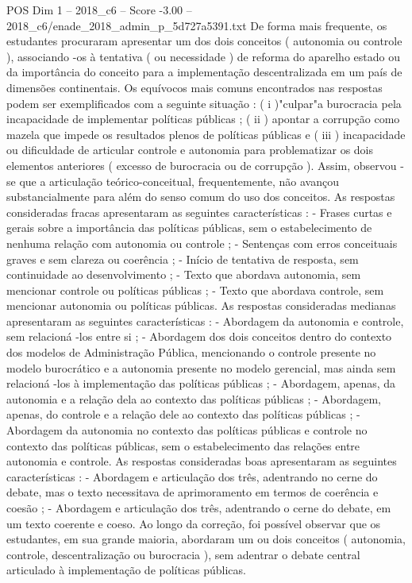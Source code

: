 \begin{textsample}{POS Dim 1 – 2018\_c6 – Score -3.00 – 2018\_c6/enade\_2018\_admin\_p\_5d727a5391.txt}
De forma mais frequente, os estudantes procuraram apresentar um dos dois conceitos ( autonomia ou controle ), associando -os à tentativa ( ou necessidade ) de reforma do aparelho estado ou da importância do conceito para a implementação descentralizada em um país de dimensões continentais.
Os equívocos mais comuns encontrados nas respostas podem ser exemplificados com a seguinte situação : ( i )"culpar"a burocracia pela incapacidade de implementar políticas públicas ; ( ii ) apontar a corrupção como mazela que impede os resultados plenos de políticas públicas e ( iii ) incapacidade ou dificuldade de articular controle e autonomia para problematizar os dois elementos anteriores ( excesso de burocracia ou de corrupção ).
Assim, observou -se que a articulação teórico-conceitual, frequentemente, não avançou substancialmente para além do senso comum do uso dos conceitos.
As respostas consideradas fracas apresentaram as seguintes características : - Frases curtas e gerais sobre a importância das políticas públicas, sem o estabelecimento de nenhuma relação com autonomia ou controle ; - Sentenças com erros conceituais graves e sem clareza ou coerência ; - Início de tentativa de resposta, sem continuidade ao desenvolvimento ; - Texto que abordava autonomia, sem mencionar controle ou políticas públicas ; - Texto que abordava controle, sem mencionar autonomia ou políticas públicas.
As respostas consideradas medianas apresentaram as seguintes características : - Abordagem da autonomia e controle, sem relacioná -los entre si ; - Abordagem dos dois conceitos dentro do contexto dos modelos de Administração Pública, mencionando o controle presente no modelo burocrático e a autonomia presente no modelo gerencial, mas ainda sem relacioná -los à implementação das políticas públicas ; - Abordagem, apenas, da autonomia e a relação dela ao contexto das políticas públicas ; - Abordagem, apenas, do controle e a relação dele ao contexto das políticas públicas ; - Abordagem da autonomia no contexto das políticas públicas e controle no contexto das políticas públicas, sem o estabelecimento das relações entre autonomia e controle.
As respostas consideradas boas apresentaram as seguintes características : - Abordagem e articulação dos três, adentrando no cerne do debate, mas o texto necessitava de aprimoramento em termos de coerência e coesão ; - Abordagem e articulação dos três, adentrando o cerne do debate, em um texto coerente e coeso.
Ao longo da correção, foi possível observar que os estudantes, em sua grande maioria, abordaram um ou dois conceitos ( autonomia, controle, descentralização ou burocracia ), sem adentrar o debate central articulado à implementação de políticas públicas.

\end{textsample}
